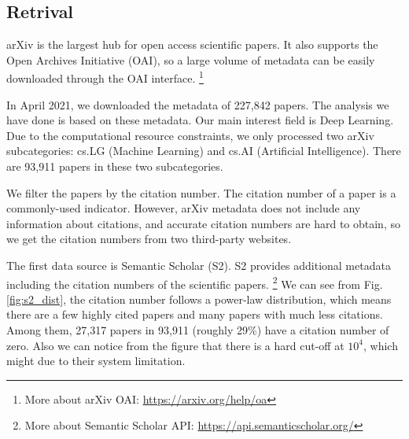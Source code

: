 \subsection{Retrival}

arXiv is the largest hub for open access scientific papers.
It also supports the Open Archives Initiative (OAI),
so a large volume of metadata can be easily downloaded through the OAI interface.
\footnote{More about arXiv OAI: \url{https://arxiv.org/help/oa}}

In April 2021, we downloaded the metadata of 227,842 papers.
The analysis we have done is based on these metadata.
Our main interest field is Deep Learning.
Due to the computational resource constraints, we only processed two arXiv subcategories: cs.LG (Machine Learning) and cs.AI (Artificial Intelligence).
There are 93,911 papers in these two subcategories.

We filter the papers by the citation number.
The citation number of a paper is a commonly-used indicator.
However, arXiv metadata does not include any information about citations,
and accurate citation numbers are hard to obtain,
so we get the citation numbers from two third-party websites.

The first data source is Semantic Scholar (S2).
S2 provides additional metadata including the citation numbers of the scientific papers.
\footnote{More about Semantic Scholar API: \url{https://api.semanticscholar.org/}}
We can see from Fig. \ref{fig:s2_dist}, the citation number follows a power-law distribution, which means there are a few highly cited papers and many papers with much less citations.
Among them, 27,317 papers in 93,911 (roughly 29\%) have a citation number of zero.
Also we can notice from the figure that there is a hard cut-off at $10^4$, which might due to their system limitation.

